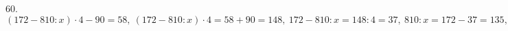 60. $(172-810:x)\cdot4-90=58,\ (172-810:x)\cdot4=58+90=148,\ 172-810:x=148:4=37,\ 810:x=172-37=135,\ x=810:135=6.$\\
